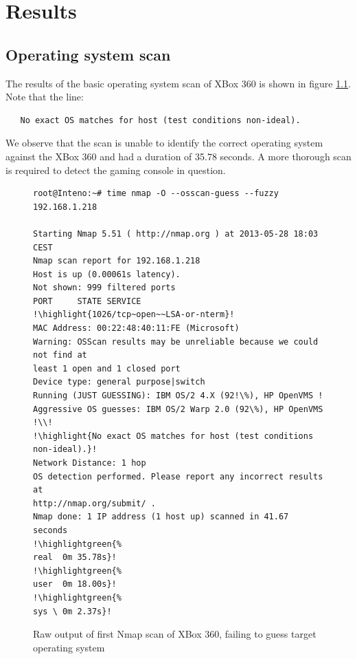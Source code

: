 \documentclass[a4paper,11pt,makeidx]{kth-bcs}
\newcommand{\reducedstrut}{\vrule width 0pt height .9\ht\strutbox depth .9\dp\strutbox\relax}
\newcommand{\highlight}[1]{%
  \begingroup
  \colorbox{light-gray!20}{\footnotesize\ttfamily#1\/}%
  \endgroup
}
\newcommand{\highlightgreen}[1]{%
  \begingroup
  \colorbox{light-green!20}{#1\/}%
  \endgroup
}
\begin{document}

\chapter{Results}
\section{Operating system scan}
The results of the basic operating system scan of XBox 360 is shown in figure \ref{fig:nmapos}.
Note that the line:
\begin{verbatim}
   No exact OS matches for host (test conditions non-ideal).
\end{verbatim}
    
We observe that the scan is unable to identify the correct operating system against the XBox 360 and had a duration of 35.78 seconds.
A more thorough scan is required to detect the gaming console in question.

   \begin{figure}[h!]
      \centering
      \begin{lstlisting}[escapechar=!]
root@Inteno:~# time nmap -O --osscan-guess --fuzzy 192.168.1.218

Starting Nmap 5.51 ( http://nmap.org ) at 2013-05-28 18:03 CEST
Nmap scan report for 192.168.1.218
Host is up (0.00061s latency).
Not shown: 999 filtered ports
PORT     STATE SERVICE
!\highlight{1026/tcp~open~~LSA-or-nterm}!
MAC Address: 00:22:48:40:11:FE (Microsoft)
Warning: OSScan results may be unreliable because we could not find at
least 1 open and 1 closed port
Device type: general purpose|switch
Running (JUST GUESSING): IBM OS/2 4.X (92!\%), HP OpenVMS !
Aggressive OS guesses: IBM OS/2 Warp 2.0 (92\%), HP OpenVMS !\\!
!\highlight{No exact OS matches for host (test conditions non-ideal).}!
Network Distance: 1 hop
OS detection performed. Please report any incorrect results at
http://nmap.org/submit/ .
Nmap done: 1 IP address (1 host up) scanned in 41.67 seconds
!\highlightgreen{%
real  0m 35.78s}!
!\highlightgreen{%
user  0m 18.00s}!
!\highlightgreen{%
sys \ 0m 2.37s}!
      \end{lstlisting}
      \caption{
         \small{
Raw output of first Nmap scan of XBox 360, failing to guess target operating system
         }
      }
      \label{fig:nmapos}
   \end{figure}
\end{document}
